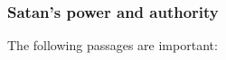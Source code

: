 	
		
	\subsubsection{Satan's power and authority}
		\label{SATAN-power}
		
		The following passages are important:
		
